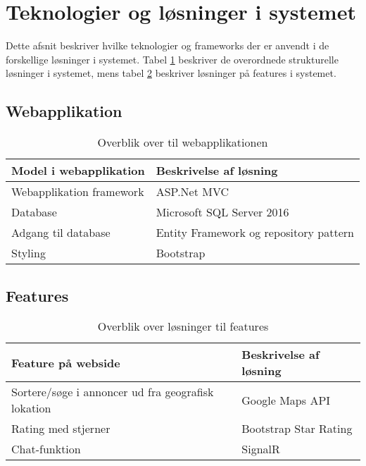 \section{Teknologier og løsninger i systemet}
Dette afsnit beskriver hvilke teknologier og frameworks der er anvendt i de forskellige løsninger i systemet. Tabel \ref{fig:Webapplikation} beskriver de overordnede strukturelle løsninger i systemet, mens tabel \ref{fig:Features} beskriver løsninger på features i systemet.
\subsection{Webapplikation}

\begin{table}[H]
	\begin{tabular}{ | l | l |}
		\hline
		\textbf{Model i webapplikation}  & \textbf{Beskrivelse af løsning} \\ \hline
		Webapplikation framework  & ASP.Net MVC \\ \hline
		Database & Microsoft SQL Server 2016 \\ \hline
		Adgang til database & Entity Framework og repository pattern \\ \hline
		Styling & Bootstrap	 \\ \hline
	\end{tabular}
	\caption{Overblik over til webapplikationen}
	\label{fig:Webapplikation}
\end{table}

\subsection{Features}

\begin{table}[H]
	\begin{tabular}{ | l | p{5cm} |}
		\hline
		\textbf{Feature på webside}  & \textbf{Beskrivelse af løsning} \\ \hline
		Sortere/søge i annoncer ud fra geografisk lokation  & Google Maps API \\ \hline
		Rating med stjerner & Bootstrap Star Rating \\ \hline
		Chat-funktion & SignalR\cite{SignalR} \\ \hline
		
	\end{tabular}
	\caption{Overblik over løsninger til features}
	\label{fig:Features}
\end{table}


